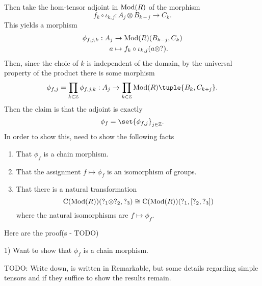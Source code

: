 \begin{remark}
    Then take the hom-tensor adjoint in \( \operatorname{Mod}(R) \) of the morphism
    \[
        f_k \circ \iota_{k, j}: A_j \otimes B_{k - j} \to C_k.
    \]
    This yields a morphism
    \begin{align*}
        \phi_{f, j, k}: A_j &\to \operatorname{Mod}(R)(B_{k - j}, C_k) \\
        a &\mapsto f_k \circ \iota_{k, j}(a \otimes ?).
    \end{align*}
    Then, since the choic of \( k \) is independent of the domain, by the universal property of the product there is some morphism
    \[
        \phi_{f, j} = \prod_{k \in \Zb} \phi_{f, j, k}: A_j \to \prod_{k \in \Zb} \Mod(R)\tuple{B_k, C_{k + j}}.
    \]
    Then the claim is that the adjoint is exactly
    \[
        \phi_f = \set{\phi_{f, j}}_{j \in \Zb}.
    \]
    In order to show this, need to show the following facts
    \begin{enumerate}
        \item {
            That \( \phi_f \) is a chain morphism.
        }
        \item {
            That the assignment \( f \mapsto \phi_f \) is an isomorphism of groups.
        }
        \item {
            That there is a natural transformation
            \[
                \operatorname{C}(\operatorname{Mod}(R))(?_1 \otimes ?_2, ?_3) \cong \operatorname{C}(\operatorname{Mod}(R))(?_1, \left[ ?_2, ?_3 \right])
            \]
            where the natural isomorphisms are \( f \mapsto \phi_f \).
        }
    \end{enumerate}
    Here are the proof(s - TODO)

    1) Want to show that \( \phi_f \) is a chain morphism.

    TODO: Write down, is written in Remarkable, but some details regarding simple tensors and if they suffice to show the results remain.
\end{remark}

